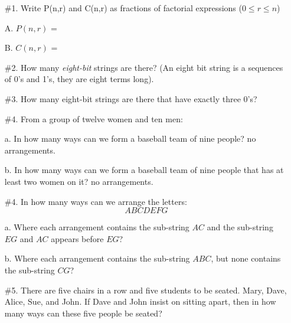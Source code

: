 \documentclass[10pt,letterpaper]{article}
\begin{document}
{

\begin{enumerate}
    \item[\#1.] Write P(n,r) and C(n,r) as fractions of factorial expressions ($0 \leq r \leq n$)
    
    \vspace{1em}
    A. $P(n,r)$ = 
    \vspace{2em}
    
    B. $C(n,r)$ =
    \vspace{4em}
    
    \item[\#2.] How many \textit{eight-bit} strings are there? (An eight bit string is a sequences of 0's and 1's, they are eight terms long).
    \vspace{4em}
    
    \item[\#3.] How many eight-bit strings are there that have exactly three 0's?
    \vspace{4em}
    
    \item[\#4.] From a group of twelve women and ten men:
    \vspace{2em}
    
    a. In how many ways can we form a baseball team of nine people? no arrangements.
    \vspace{3em}
    
    b. In how many ways can we form a baseball team of nine people that has at least two women on it? no arrangements.
    \vspace{3em}
    
    \item[\#4.] In how many ways can we arrange the letters:$$ A B C D E F G $$
    
    a. Where each arrangement contains the sub-string $AC$ and the sub-string $EG$ and $AC$ appears before $EG$?
    \vspace{3em}
    
    b. Where each arrangement contains the sub-string $ABC$, but none contains the sub-string $CG$?
    \vspace{4em}
    
    \item[\#5.] There are five chairs in a row and five students to be seated. Mary, Dave, Alice, Sue, and John. If Dave and John insist on sitting apart, then in how many ways can these five people be seated?
    
    \vspace{4em}

\end{enumerate}
}
\end{document}

